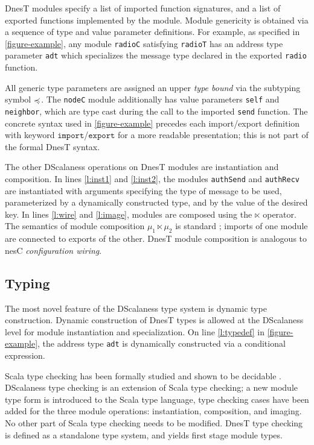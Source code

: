 DnesT modules specify a list of imported function signatures, and a list of exported functions
implemented by the module. Module genericity is obtained via a sequence of type and value
parameter definitions. For example, as specified in \autoref{figure-example}, any module
\texttt{radioC} satisfying \texttt{radioT} has an address type parameter \texttt{adt} which
specializes the message type declared in the exported \texttt{radio} function.

All generic type parameters are assigned an upper \emph{type bound} via the subtyping symbol
$\preccurlyeq$. The \texttt{nodeC} module additionally has value parameters \texttt{self} and
\texttt{neighbor}, which are type cast during the call to the imported \texttt{send} function.
The concrete syntax used in \autoref{figure-example} precedes each import/export definition with
keyword $\texttt{import}$/$\texttt{export}$ for a more readable presentation; this is not part
of the formal DnesT syntax.
  
The other DScalaness operations on DnesT modules are instantiation and composition. In lines
\ref{l:inst1} and \ref{l:inst2}, the modules \texttt{authSend} and \texttt{authRecv} are
instantiated with arguments specifying the type of message to be used, parameterized by a
dynamically constructed type, and by the value of the desired key. In lines \ref{l:wire} and
\ref{l:image}, modules are composed using the $\ltimes$ operator. The semantics of module
composition $\mu_1 \ltimes \mu_2$ is standard \cite{Cardelli-1997}; imports of one module are
connected to exports of the other. DnesT module composition is analogous to nesC
\emph{configuration wiring}.

\subsection{Typing} 

The most novel feature of the DScalaness type system is dynamic type construction. Dynamic
construction of DnesT types is allowed at the DScalaness level for module instantiation and
specialization. On line \ref{l:typedef} in \autoref{figure-example}, the address type
\texttt{adt} is dynamically constructed via a conditional expression.

Scala type checking has been formally studied and shown to be decidable
\cite{Cremet:2006:CCS:2135978.2135980}. DScalaness type checking is an extension of Scala type
checking; a new module type form is introduced to the Scala type language, type checking cases
have been added for the three module operations: instantiation, composition, and imaging. No
other part of Scala type checking needs to be modified. DnesT type checking is defined as a
standalone type system, and yields first stage module types.

